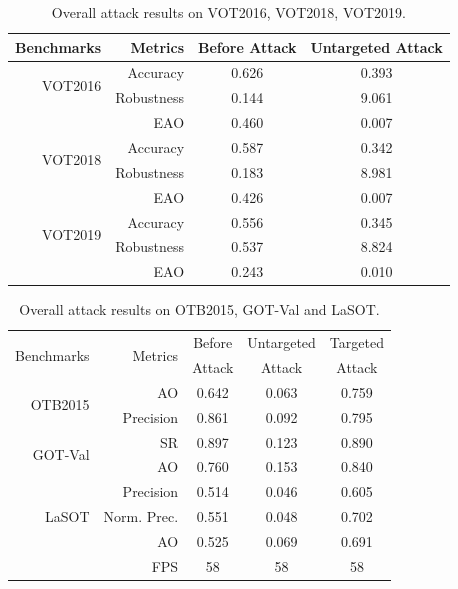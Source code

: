 \documentclass[journal]{IEEEtran}
\begin{document}
\begin{table}[t]
  \centering
  \caption{Overall attack results on VOT2016, VOT2018, VOT2019.}
  \begin{tabular}{rrcc}
  \toprule
  Benchmarks & Metrics & Before Attack    & Untargeted Attack  \\
  \midrule
  \multirow{2}{*}[-6pt]{VOT2016} 
  & Accuracy   & 0.626 & 0.393\\
  & Robustness & 0.144 & 9.061\\
  & EAO        & 0.460 & 0.007\\
  \midrule
  \multirow{2}{*}[-6pt]{VOT2018} 
  & Accuracy   & 0.587 & 0.342\\
  & Robustness & 0.183 & 8.981\\
  & EAO        & 0.426 & 0.007\\
  \midrule
  \multirow{2}{*}[-6pt]{VOT2019} 
  & Accuracy   & 0.556 & 0.345\\
  & Robustness & 0.537 & 8.824\\
  & EAO        & 0.243 & 0.010\\
  \bottomrule
  \end{tabular}
  \label{tab:benchmark results1}
\end{table}

\begin{table}[t]
  \centering
  \caption{Overall attack results on OTB2015, GOT-Val and LaSOT.}
  \begin{tabular}{rrccc}
  \toprule
  \multirow{2}{*}{Benchmarks} & \multirow{2}{*}{Metrics} & Before    & Untargeted & Targeted  \\
                            &                         & Attack & Attack & Attack     \\ 
  \midrule
  \multirow{2}{*}{OTB2015} 
  & AO   & 0.642 & 0.063 & 0.759\\
  & Precision & 0.861 & 0.092 & 0.795\\
  \midrule
  \multirow{2}{*}{GOT-Val} 
  & SR & 0.897 & 0.123 & 0.890\\
  & AO & 0.760 & 0.153 & 0.840 \\
  \midrule
  \multirow{3}{*}{LaSOT} 
  & Precision  & 0.514 & 0.046 & 0.605\\
  & Norm. Prec.& 0.551 & 0.048 & 0.702\\
  & AO         & 0.525 & 0.069 & 0.691\\
  \midrule
  \multicolumn{2}{r}{FPS} & 58 & 58 & 58\\
  \bottomrule
  \end{tabular}
  \label{tab:benchmark results}
  \vspace{-3mm}
\end{table}
\end{document}
